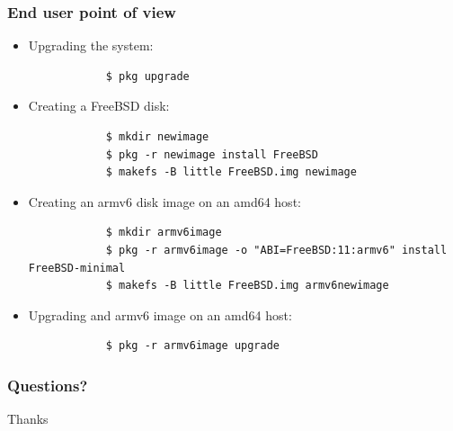 \begin{frame}[fragile]
	\frametitle{End user point of view}
	\begin{itemize}
		\item Upgrading the system:
			\begin{lstlisting}
			$ pkg upgrade
			\end{lstlisting}
		\item Creating a FreeBSD disk:
			\begin{lstlisting}
			$ mkdir newimage
			$ pkg -r newimage install FreeBSD
			$ makefs -B little FreeBSD.img newimage
			\end{lstlisting}
		\item Creating an armv6 disk image on an amd64 host:
			\begin{lstlisting}
			$ mkdir armv6image
			$ pkg -r armv6image -o "ABI=FreeBSD:11:armv6" install FreeBSD-minimal
			$ makefs -B little FreeBSD.img armv6newimage
			\end{lstlisting}
		\item Upgrading and armv6 image on an amd64 host:
			\begin{lstlisting}
			$ pkg -r armv6image upgrade
			\end{lstlisting}
	\end{itemize}
\end{frame}

\begin{frame}
	\frametitle{Questions?}
	\center
	\Huge Thanks
\end{frame}

